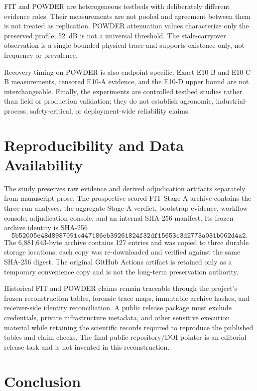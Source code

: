 \documentclass[journal]{IEEEtran}
\begin{document}
FIT and POWDER are heterogeneous testbeds with deliberately different evidence roles. Their measurements are not pooled and agreement between them is not treated as replication. POWDER attenuation values characterize only the preserved profile; 52~dB is not a universal threshold. The stale-carryover observation is a single bounded physical trace and supports existence only, not frequency or prevalence.

Recovery timing on POWDER is also endpoint-specific. Exact E10-B and E10-C-B measurements, censored E10-A evidence, and the E10-D upper bound are not interchangeable. Finally, the experiments are controlled testbed studies rather than field or production validation; they do not establish agronomic, industrial-process, safety-critical, or deployment-wide reliability claims.

\section{Reproducibility and Data Availability}
\label{sec:repro}

The study preserves raw evidence and derived adjudication artifacts separately from manuscript prose. The prospective scored FIT Stage-A archive contains the three run analyses, the aggregate Stage-A verdict, bootstrap evidence, workflow console, adjudication console, and an internal SHA-256 manifest. Its frozen archive identity is SHA-256
\[
\texttt{5b52005e48d8987091c447186eb39261824f32df15653c3d2773a031b062d4a2}.
\]
The 6,881,643-byte archive contains 127 entries and was copied to three durable storage locations; each copy was re-downloaded and verified against the same SHA-256 digest. The original GitHub Actions artifact is retained only as a temporary convenience copy and is not the long-term preservation authority.

Historical FIT and POWDER claims remain traceable through the project's frozen reconstruction tables, forensic trace maps, immutable archive hashes, and receiver-side identity reconciliation. A public release package must exclude credentials, private infrastructure metadata, and other sensitive execution material while retaining the scientific records required to reproduce the published tables and claim checks. The final public repository/DOI pointer is an editorial release task and is not invented in this reconstruction.

\section{Conclusion}
\label{sec:conclusion}
\end{document}
